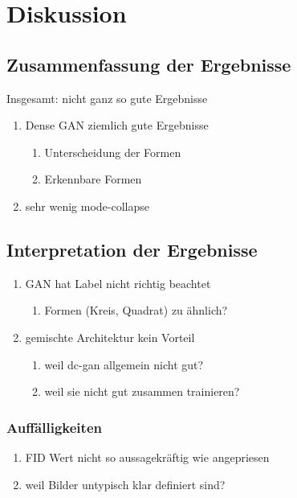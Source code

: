 
\chapter{Diskussion}

\section{Zusammenfassung der Ergebnisse}
Insgesamt: nicht ganz so gute Ergebnisse
\begin{enumerate}
	\item Dense GAN ziemlich gute Ergebnisse
	\begin{enumerate}
		\item Unterscheidung der Formen
		\item Erkennbare Formen
	\end{enumerate}
	
	\item sehr wenig mode-collapse 
\end{enumerate}

\section{Interpretation der Ergebnisse}

\begin{enumerate}
	\item GAN hat Label nicht richtig beachtet
	\begin{enumerate}
		\item Formen (Kreis, Quadrat) zu ähnlich?
	\end{enumerate}

	\item gemischte Architektur kein Vorteil
	\begin{enumerate}
		\item weil dc-gan allgemein nicht gut?
		\item weil sie nicht gut zusammen trainieren?
	\end{enumerate}
\end{enumerate}

\subsection{Auffälligkeiten}
\begin{enumerate}
	\item FID Wert nicht so aussagekräftig wie angepriesen
	\item weil Bilder untypisch klar definiert sind?
\end{enumerate}


